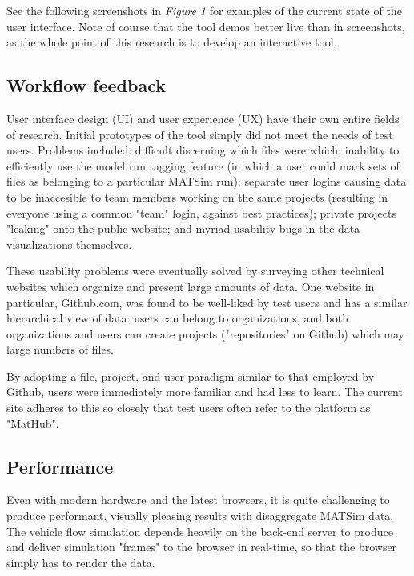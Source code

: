 \documentclass[Afour,sagev,times]{sagej}
\begin{document}
See the following screenshots in \textit{Figure 1} for examples of the current state of the user interface. Note of course that the tool demos better live than in screenshots, as the whole point of this research is to develop an interactive tool.


\subsection{Workflow feedback}

User interface design (UI) and user experience (UX) have their own entire fields of research. Initial prototypes of the tool simply did not meet the needs of test users. Problems included: difficult discerning which files were which; inability to efficiently use the model run tagging feature (in which a user could mark sets of files as belonging to a particular MATSim run); separate user logins causing data to be inaccesible to team members working on the same projects (resulting in everyone using a common "team" login, against best practices); private projects "leaking" onto the public website; and myriad usability bugs in the data visualizations themselves.

These usability problems were eventually solved by surveying other technical websites which organize and present large amounts of data. One website in particular, Github.com, was found to be well-liked by test users and has a similar hierarchical view of data: users can belong to organizations, and both organizations and users can create projects ("repositories" on Github) which may large numbers of files.

By adopting a file, project, and user paradigm similar to that employed by Github, users were immediately more familiar and had less to learn. The current site adheres to this so closely that test users often refer to the platform as "MatHub".

\subsection{Performance}

Even with modern hardware and the latest browsers, it is quite challenging to produce performant, visually pleasing results with disaggregate MATSim data. The vehicle flow simulation depends heavily on the back-end server to produce and deliver simulation "frames" to the browser in real-time, so that the browser simply has to render the data.
\end{document}
